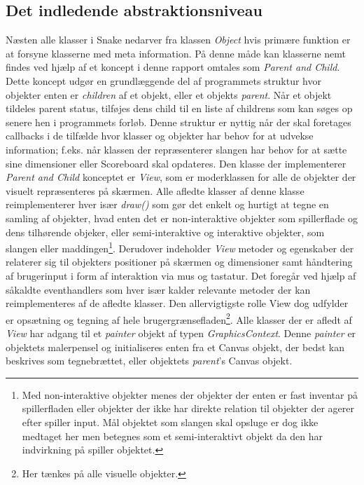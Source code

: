 \documentclass[]{article}
\begin{document}
\subsection{Det indledende abstraktionsniveau}
Næsten alle klasser i Snake nedarver fra klassen \textit{Object} hvis primære funktion er at forsyne klasserne med meta information. På denne måde kan klasserne nemt findes ved hjælp af et koncept i denne rapport omtales som \textit{Parent and Child}. Dette koncept udgør en grundlæggende del af programmets struktur hvor objekter enten er \textit{children} af et objekt, eller et objekts \textit{parent}. Når et objekt tildeles parent status, tilføjes dens child til en liste af childrens som kan søges op senere hen i programmets forløb. Denne struktur er nyttig når der skal foretages callbacks i de tilfælde hvor klasser og objekter har behov for at udvekse information; f.eks. når klassen der repræsenterer slangen har behov for at sætte sine dimensioner eller Scoreboard skal opdateres.
Den klasse der implementerer \textit{Parent and Child} konceptet er \textit{View}, som er moderklassen for alle de objekter der visuelt repræsenteres på skærmen. Alle afledte klasser af denne klasse reimplementerer hver især \textit{draw()} som gør det enkelt og hurtigt at tegne en samling af objekter, hvad enten det er non-interaktive objekter som spillerflade og dens tilhørende objeker, eller semi-interaktive og interaktive objekter, som slangen eller maddingen\footnote{Med non-interaktive objekter menes der objekter der enten er fast inventar på spillerfladen eller objekter der ikke har direkte relation til objekter der agerer efter spiller input. Mål objektet som slangen skal opsluge er  dog ikke medtaget her men betegnes som et semi-interaktivt objekt da den har indvirkning på spiller objektet.}.  Derudover indeholder \textit{View} metoder og egenskaber der relaterer sig til objekters positioner på skærmen og dimensioner samt håndtering af brugerinput i form af interaktion via mus og tastatur. Det foregår ved hjælp af såkaldte eventhandlers som hver især kalder relevante metoder der kan reimplementeres af de afledte klasser. Den allervigtigste rolle View dog udfylder er opsætning og tegning af hele brugergrænsefladen\footnote{Her tænkes på alle visuelle objekter.}. Alle klasser der er afledt af \textit{View} har adgang til et \textit{painter} objekt af typen \textit{GraphicsContext}. Denne \textit{painter} er objektets malerpensel og initialiseres enten fra et Canvas objekt, der bedst kan beskrives som tegnebrættet, eller objektets \textit{parent}'s Canvas objekt.
\end{document}
